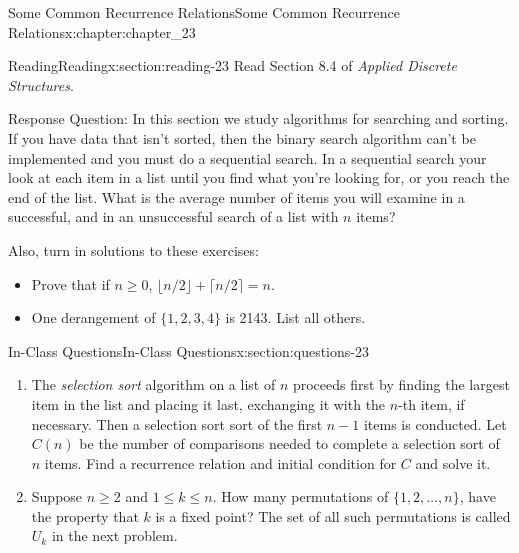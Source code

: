 \documentclass[oneside,10pt,]{book}
\numberwithin{equation}{section}
\begin{document}
\begin{chapterptx}{Some Common Recurrence Relations}{}{Some Common Recurrence Relations}{}{}{x:chapter:chapter_23}
\index{}%
%
%
\typeout{************************************************}
\typeout{************************************************}
%
\begin{sectionptx}{Reading}{}{Reading}{}{}{x:section:reading-23}
Read Section 8.4 of \emph{Applied Discrete Structures}.%
\par
Response Question: In this section we study algorithms for searching and sorting.  If you have data that isn't sorted, then the binary search algorithm can't be implemented and you must do a sequential search. In a sequential search your look at each item in a list until you find what you're looking for, or you reach the end of the list.  What is the average number of items you will examine in a successful, and in an unsuccessful search of a list with \(n\) items?%
\par
Also, turn in solutions to these exercises:%
\begin{itemize}[label=\textbullet]
\item{}Prove that if \(n \geq 0\), \(\lfloor n/2\rfloor +\lceil n/2\rceil = n\).%
\item{}One derangement of \(\{1,2,3,4\}\) is 2143.  List all others.%
\end{itemize}
%
\end{sectionptx}
%
%
\typeout{************************************************}
\typeout{************************************************}
%
\begin{sectionptx}{In-Class Questions}{}{In-Class Questions}{}{}{x:section:questions-23}
%
\begin{enumerate}[label=\arabic*.]
\item{}The \emph{selection sort} algorithm on a list of \(n\) proceeds first by finding the largest item in the list and placing it last, exchanging it with the \(n\)-th item, if necessary.  Then a selection sort sort of the first \(n-1\) items is conducted. Let \(C(n)\) be the number of comparisons needed to complete a selection sort of \(n\) items.   Find a recurrence relation and initial condition for \(C\) and solve it.%
\item{}Suppose \(n \geq 2\) and \(1 \leq k \leq n\).  How many permutations of \(\{1,2, \dots ,n\}\),  have the property that \(k\) is a fixed point?  The set of all such permutations is called \(U_k\) in the next problem.%

\end{enumerate}
\end{sectionptx}
\end{chapterptx}
\end{document}
